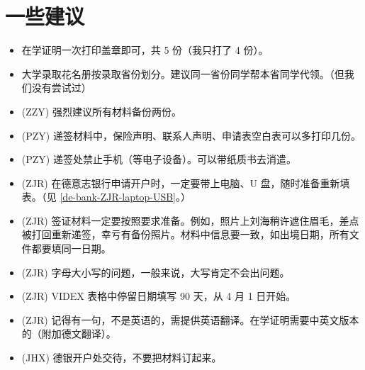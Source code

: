 \documentclass[final]{book}
\begin{document}
\chapter{一些建议}
\begin{itemize}
  \item 在学证明一次打印盖章即可，共 5 份（我只打了 4 份）。
  \item 大学录取花名册按录取省份划分。建议同一省份同学帮本省同学代领。（但我们没有尝试过）
  \item (ZZY) 强烈建议所有材料备份两份。
  \item (PZY) 递签材料中，保险声明、联系人声明、申请表空白表可以多打印几份。
  \item (PZY) 递签处禁止手机（等电子设备）。可以带纸质书去消遣。
  \item (ZJR) 在德意志银行申请开户时，一定要带上电脑、U 盘，随时准备重新填表。（见 \ref{de-bank-ZJR-laptop-USB}。）
  \item (ZJR) 签证材料一定要按照要求准备。例如，照片上刘海稍许遮住眉毛，差点被打回重新递签，幸亏有备份照片。材料中信息要一致，如出境日期，所有文件都要填同一日期。
  \item (ZJR) 字母大小写的问题，一般来说，大写肯定不会出问题。
  \item (ZJR) VIDEX 表格中停留日期填写 90 天，从 4 月 1 日开始。
  \item (ZJR) 记得有一句，不是英语的，需提供英语翻译。在学证明需要中英文版本的（附加德文翻译）。
  \item (JHX) 德银开户处交待，不要把材料订起来。
\end{itemize}
\end{document}
